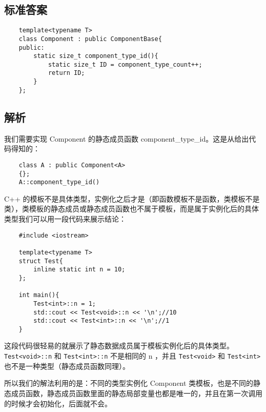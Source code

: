 

\subsection{标准答案}

\begin{verbatim}
    template<typename T>
    class Component : public ComponentBase{
    public:
        static size_t component_type_id(){
            static size_t ID = component_type_count++;
            return ID;
        }
    };
\end{verbatim}

\subsection{解析}

我们需要实现 Component 的静态成员函数 component\_type\_id。这是从给出代码得知的：

\begin{verbatim}
    class A : public Component<A>
    {};
    A::component_type_id()
\end{verbatim}

C++ 的模板不是具体类型，实例化之后才是（即函数模板不是函数，类模板不是类），类模板的静态成员或静态成员函数也不属于模板，而是属于实例化后的具体类型我们可以用一段代码来展示结论：

\begin{verbatim}
    #include <iostream>

    template<typename T>
    struct Test{
        inline static int n = 10;
    };
    
    int main(){
        Test<int>::n = 1;
        std::cout << Test<void>::n << '\n';//10
        std::cout << Test<int>::n << '\n';//1
    }
\end{verbatim}

这段代码很轻易的就展示了静态数据成员属于模板实例化后的具体类型。 \texttt{Test<void>::n} 和 \texttt{Test<int>::n} 不是相同的 n
，并且 \texttt{Test<void>} 和 \texttt{Test<int>} 也不是一种类型（静态成员函数同理）。

所以我们的解法利用的是：不同的类型实例化 Component 类模板，也是不同的静态成员函数，静态成员函数里面的静态局部变量也都是唯一的，并且在第一次调用的时候才会初始化，后面就不会。

\clearpage